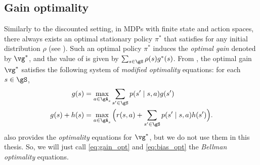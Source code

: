 \subsection{Gain optimality}
\label{ch:mdp:ssec:gain}

Similarly to the discounted setting, in MDPs with finite state and action spaces, there always exists an optimal stationary policy $\pi^*$ that satisfies  for any initial distribution $\rho$ (see \cite[Theorem~9.1.8]{puterman2014markov}).
Such an optimal policy $\pi^*$ induces the \emph{optimal gain} denoted by $\vg^*$, and the value of  is given by $\sum_{s\in\gS} \rho(s)g^*(s)$.
From \cite[Chapter~9]{puterman2014markov}, the optimal gain $\vg^*$ satisfies the following system of \emph{modified optimality} equations: for each $s\in\gS$,
\begin{align}
    g(s) &= \max_{a\in\gA_s} \sum_{s'\in\gS}p(s'\mid s,a)g(s') \label{eq:gain_opt} \\
    g(s) +h(s) &= \max_{a\in\gA_s}\Big(r(s,a) +\sum_{s'\in\gS}p(s'\mid s,a)h(s')\Big) \label{eq:bias_opt}.
\end{align}
\cite[Chapter~9]{puterman2014markov} also provides the \emph{optimality} equations for $\vg^*$, but we do not use them in this thesis.
So, we will just call \eqref{eq:gain_opt} and \eqref{eq:bias_opt} the \emph{Bellman optimality} equations.

